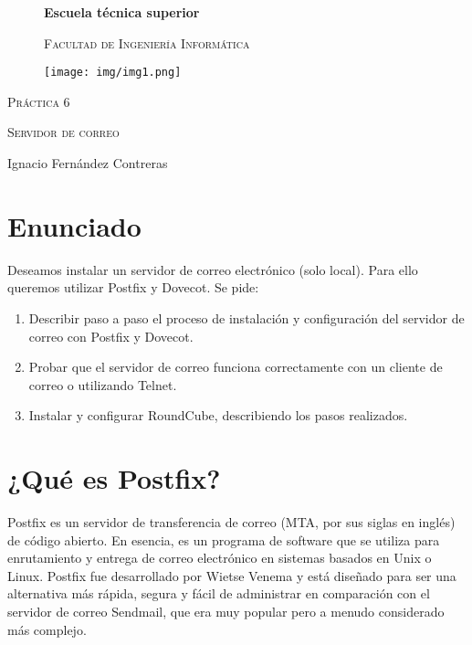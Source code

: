 \documentclass{article}
\begin{document}
\begin{titlepage}
\centering
\begin{figure}
\centering
{\bfseries\LARGE Escuela técnica superior\par}
{\scshape\Large Facultad de Ingeniería Informática\par}
\vspace{5cm}
\centering
\texttt{[image: img/img1.png]} 
\end{figure}


{\scshape\Huge Práctica 6\par}
{\scshape\Large Servidor de correo\par}
\vspace{9cm}
{\Large Ignacio Fernández Contreras\par}
\vfill
\end{titlepage}
\clearpage\hbox{}\thispagestyle{empty}\newpage

\section{Enunciado}
Deseamos instalar un servidor de correo electrónico (solo local). Para ello queremos utilizar Postfix
y Dovecot. Se pide:
\begin{enumerate}
\item Describir paso a paso el proceso de instalación y configuración del servidor de correo con Postfix y Dovecot. 
\item Probar que el servidor de correo funciona correctamente con un cliente de correo o
utilizando Telnet. 
\item Instalar y configurar RoundCube, describiendo los pasos realizados.
\end{enumerate}


\section{¿Qué es Postfix?}
Postfix es un servidor de transferencia de correo (MTA, por sus siglas en inglés) de código abierto. En esencia, es un programa de software que se utiliza para enrutamiento y entrega de correo electrónico en sistemas basados en Unix o Linux. Postfix fue desarrollado por Wietse Venema y está diseñado para ser una alternativa más rápida, segura y fácil de administrar en comparación con el servidor de correo Sendmail, que era muy popular pero a menudo considerado más complejo.\\
\end{document}
